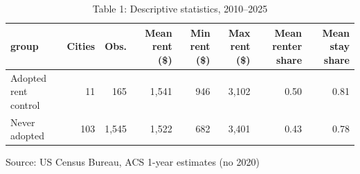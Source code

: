 \begin{table}[t]
\caption*{
{\fontsize{20}{25}\selectfont  Table 1: Descriptive statistics, 2010–2025\fontsize{12}{15}\selectfont }
} 
\fontsize{12.0pt}{14.0pt}\selectfont
\begin{tabular*}{\linewidth}{@{\extracolsep{\fill}}lrrrrrrr}
\toprule
group & Cities & Obs. & Mean rent (\$) & Min rent (\$) & Max rent (\$) & Mean renter share & Mean stay share \\ 
\midrule\addlinespace[2.5pt]
Adopted rent control & 11 & 165 & 1,541 & 946 & 3,102 & 0.50 & 0.81 \\ 
Never adopted & 103 & 1,545 & 1,522 & 682 & 3,401 & 0.43 & 0.78 \\ 
\bottomrule
\end{tabular*}
\begin{minipage}{\linewidth}
\vspace{.05em}
Source: US Census Bureau, ACS 1-year estimates (no 2020)\\
\end{minipage}
\end{table}

